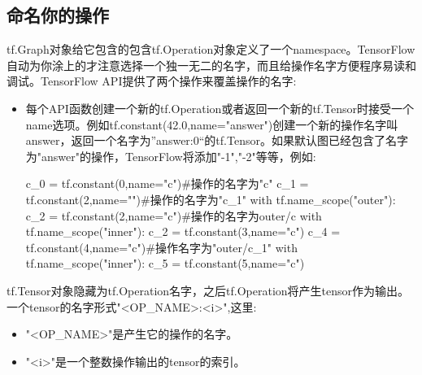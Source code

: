 \subsection{命名你的操作}
tf.Graph对象给它包含的包含tf.Operation对象定义了一个namespace。TensorFlow自动为你涂上的才注意选择一个独一无二的名字，而且给操作名字方便程序易读和调试。TensorFlow API提供了两个操作来覆盖操作的名字:
\begin{itemize}
\item 每个API函数创建一个新的tf.Operation或者返回一个新的tf.Tensor时接受一个name选项。例如tf.constant(42.0,name="answer")创建一个新的操作名字叫answer，返回一个名字为”answer:0“的tf.Tensor。如果默认图已经包含了名字为"answer"的操作，TensorFlow将添加"-1","-2"等等，例如:
\begin{python}
c_0 = tf.constant(0,name="c")#操作的名字为"c"
c_1 = tf.constant(2,name="")#操作的名字为"c_1"
with tf.name_scope("outer"):
    c_2 = tf.constant(2,name="c")#操作的名字为outer/c
    with tf.name_scope("inner"):
        c_2 = tf.constant(3,name="c")
    c_4 = tf.constant(4,name="c")#操作名字为"outer/c_1"
    with tf.name_scope("inner"):
        c_5 = tf.constant(5,name="c")
\end{python}
\end{itemize}
tf.Tensor对象隐藏为tf.Operation名字，之后tf.Operation将产生tensor作为输出。一个tensor的名字形式"<OP\_NAME>:<i>",这里:
\begin{itemize}
\item "<OP_NAME>"是产生它的操作的名字。
\item "<i>"是一个整数操作输出的tensor的索引。
\end{itemize}
